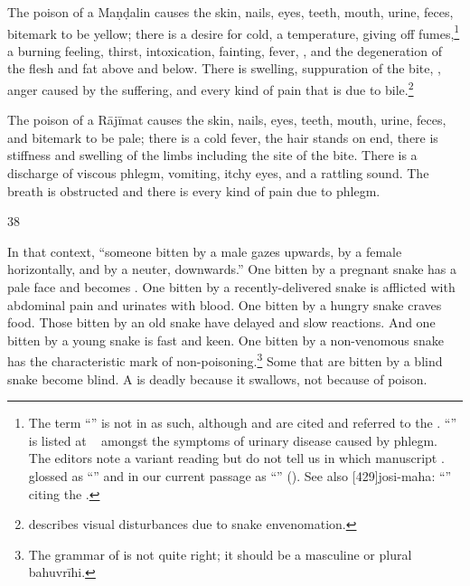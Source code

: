 \begin{translation}

The poison of a Maṇḍalin causes the skin, nails, eyes, teeth, mouth,
urine, feces, bitemark  to be yellow; there is a desire for cold, a
temperature, giving off fumes,\footnote{The term
    “” is not in \cite[596]{moni-sans} as
    such, although  and  
    are
    cited and referred to the \SS. “” is
    listed at \SS\  amongst the symptoms of urinary disease
    caused by phlegm. The editors note a variant reading 
    but do not tell us in which manuscript \citep[291, n.\,3]{vulgate}.
     glossed  as
    “” and in our current passage as
    “” (\cite[573]{vulgate}).
    See also [429]{josi-maha}:  “” citing the \SS.} a burning feeling, thirst,
    intoxication, fainting, fever, , and the
    degeneration of the flesh and fat above and below. There is swelling,
    suppuration of the bite, , anger 
    caused by the suffering, and every kind of pain that is due to 
    bile.\footnote{\citet{ghos-2023} describes visual disturbances due to snake 
    envenomation.}

The poison of a Rājīmat causes the skin, nails, eyes, teeth, mouth,
urine, feces, and bitemark to be pale; there  is a cold fever, the hair
stands on end, there is stiffness and swelling of the limbs including the
site of the bite. There is a discharge of viscous phlegm, vomiting, itchy
eyes, and a rattling sound.  The breath is obstructed and there is every
kind of pain due to phlegm.


\item[38]

In that context, “someone bitten by a male gazes upwards,   by a female
horizontally, and by a neuter, downwards.” One bitten by a pregnant snake
has a pale face and becomes . One bitten by a
recently-delivered snake is afflicted with abdominal pain and urinates
with blood. One bitten by a hungry snake craves food.  Those bitten by an
old snake have delayed and slow reactions. And one bitten by a young
snake is fast and keen.  One bitten by a non-venomous snake has the
characteristic mark of non-poisoning.\footnote{The grammar of
     is not quite right; it should be a masculine or plural
    bahuvrīhi.} Some that are bitten by a blind snake become blind.  A
     is deadly because it swallows, not because of
    poison.


\end{translation}
